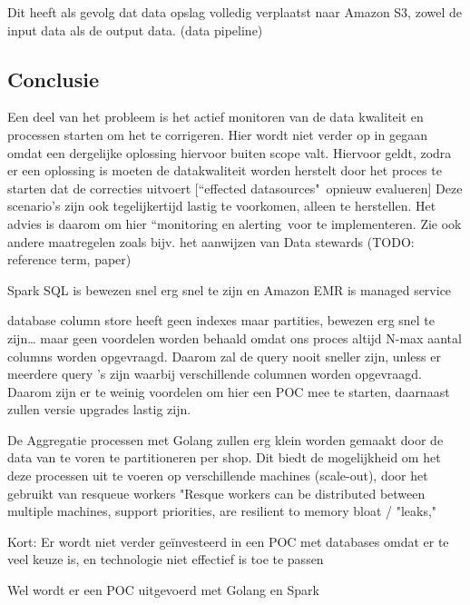 Dit heeft als gevolg dat data opslag volledig verplaatst naar Amazon S3, zowel de input data als de output data. (data pipeline)

    
\subsection{Conclusie}

Een deel van het probleem is het actief monitoren van de data kwaliteit en processen starten om het te corrigeren. Hier wordt niet verder op in gegaan omdat een dergelijke oplossing hiervoor buiten scope valt. Hiervoor geldt, zodra er een oplossing is moeten de datakwaliteit worden herstelt door het proces te starten dat de correcties uitvoert [``effected datasources"\ opnieuw evalueren]
Deze scenario's zijn ook tegelijkertijd lastig te voorkomen, alleen te herstellen. Het advies is daarom om hier ``monitoring en alerting\ voor te implementeren. Zie ook andere maatregelen zoals bijv. het aanwijzen van Data stewards (TODO: reference term, paper)

Spark SQL is bewezen snel erg snel te zijn en Amazon EMR is managed service

database column store heeft geen indexes maar partities, bewezen erg snel te zijn… maar geen voordelen worden behaald omdat  ons proces altijd N-max aantal columns worden opgevraagd. Daarom zal de query nooit sneller zijn, unless er meerdere query 's zijn waarbij verschillende columnen worden opgevraagd. Daarom zijn er te weinig voordelen om hier een POC mee te starten, daarnaast zullen versie upgrades lastig zijn. 

De Aggregatie processen met Golang zullen erg klein worden gemaakt door de data van te voren te partitioneren per shop. Dit biedt de mogelijkheid om het deze processen uit te voeren op verschillende machines (scale-out), door het gebruikt van resqueue workers "Resque workers can be distributed between multiple machines, support priorities, are resilient to memory bloat / "leaks," \parencite{github2016reque} 


Kort: Er wordt niet verder geïnvesteerd in een POC met databases omdat er te veel keuze is, en technologie niet effectief is toe te passen

Wel wordt er een POC uitgevoerd met Golang en Spark


